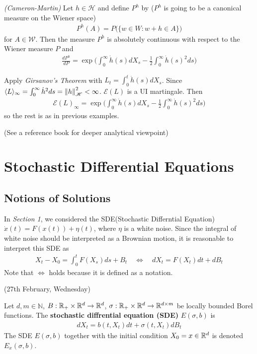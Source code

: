 \documentclass[12pt,a4paper]{article}
\newenvironment{proof}
{\begin{changemargin}{0.5cm}{0.5cm} 
	}%
	{\end{changemargin}
}
\newenvironment{p}
{\begin{proof} 
	}%
	{\end{proof}
}
\begin{document}
\thm \emph{(Cameron-Martin)} Let $h\in \mathscr{H}$ and define $P^h$ by ($P^h$ is going to be a canonical measure on the Wiener space)
\begin{align*}
P^h(A) = P \big( \{ w\in W : w+ h \in A \} \big)
\end{align*}
for $A\in \mathscr{W}$. Then the measure $P^h$ is absolutely continuous with respect to the Wiener measure $P$ and
\begin{align*}
\frac{dP^h}{dP} = \exp \Big( \int_0^{\infty} \dot{h}(s) dX_s - \frac{1}{2}\int_0^{\infty} \dot{h}(s)^2 ds \Big)
\end{align*}
\begin{p}
\pf Apply \emph{Girsanov's Theorem} with $L_t = \int_0^{t} \dot{h}(s) dX_s$. Since $\langle L \rangle_{\infty} = \int_0^{\infty} \dot{h}^2 ds = \snorms{h}{\mathscr{H}}^2 < \infty$. $\mathscr{E}(L)$ is a UI martingale. Then
\begin{align*}
\mathscr{E}(L)_{\infty} = \exp \Big( \int_0^{\infty} \dot{h}(s) dX_s - \frac{1}{2}\int_0^{\infty} \dot{h}(s)^2 ds \Big)
\end{align*}
so the rest is as in previous examples.

\eop
\end{p}

(See a reference book for deeper analytical viewpoint)


\section{Stochastic Differential Equations}

\subsection{Notions of Solutions}

In \emph{Section 1}, we considered the SDE(Stochastic Differntial Equation) $\dot{x}(t) =F(x(t)) + \eta(t)$, where $\eta$ is a white noise. Since the integral of white noise should be interpreted as a Brownian motion, it is reasonable to interpret this SDE as
\begin{align*}
X_t - X_0 = \int_0^t F(X_s) ds + B_t \quad \Leftrightarrow \quad dX_t = F(X_t) dt + dB_t 
\end{align*}
Note that $\Leftrightarrow$ holds because it is defined as a notation.
\s

\newday

(27th February, Wednesday)
\s

 Let $d, m\in \mathbb{N}$, $B: \mathbb{R}_+ \times \mathbb{R}^d \rightarrow \mathbb{R}^d$, $\sigma : \mathbb{R}_+ \times \mathbb{R}^d \rightarrow \mathbb{R}^{d\times m}$ be locally bounded Borel functions. The \textbf{stochastic diffrential equation (SDE)} $E(\sigma, b)$ is
\begin{align*}
dX_t = b(t, X_t) dt + \sigma(t, X_t) dB_t
\end{align*}
The SDE $E(\sigma, b)$ together with the initial condition $X_0 = x\in \mathbb{R}^d$ is denoted $E_x(\sigma, b)$.
\s
\end{document}
